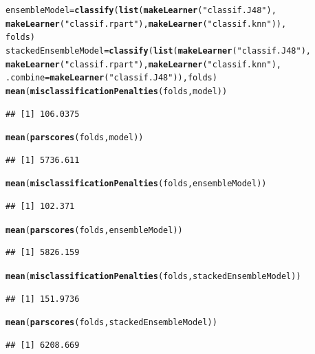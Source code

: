 \documentclass{article}\usepackage[]{graphicx}\usepackage[]{color}
\makeatletter
\newcommand{\hlstr}[1]{\textcolor[rgb]{0.192,0.494,0.8}{#1}}%
\newcommand{\hlstd}[1]{\textcolor[rgb]{0.345,0.345,0.345}{#1}}%
\newcommand{\hlkwb}[1]{\textcolor[rgb]{0.69,0.353,0.396}{#1}}%
\newcommand{\hlkwc}[1]{\textcolor[rgb]{0.333,0.667,0.333}{#1}}%
\newcommand{\hlkwd}[1]{\textcolor[rgb]{0.737,0.353,0.396}{\textbf{#1}}}%
\newenvironment{kframe}{%
 \def\at@end@of@kframe{}%
 \ifinner\ifhmode%
  \def\at@end@of@kframe{\end{minipage}}%
  \begin{minipage}{\columnwidth}%
 \fi\fi%
 \def\FrameCommand##1{\hskip\@totalleftmargin \hskip-\fboxsep
 \colorbox{shadecolor}{##1}\hskip-\fboxsep
     \hskip-\linewidth \hskip-\@totalleftmargin \hskip\columnwidth}%
 \MakeFramed {\advance\hsize-\width
   \@totalleftmargin\z@ \linewidth\hsize
   \@setminipage}}%
 {\par\unskip\endMakeFramed%
 \at@end@of@kframe}
\newenvironment{knitrout}{}{} %
\makeatother
\begin{document}
\begin{knitrout}
\color{fgcolor}\begin{kframe}
\begin{alltt}
\hlstd{ensembleModel} \hlkwb{=} \hlkwd{classify}\hlstd{(}\hlkwd{list}\hlstd{(}\hlkwd{makeLearner}\hlstd{(}\hlstr{"classif.J48"}\hlstd{),}
    \hlkwd{makeLearner}\hlstd{(}\hlstr{"classif.rpart"}\hlstd{),} \hlkwd{makeLearner}\hlstd{(}\hlstr{"classif.knn"}\hlstd{)),}
    \hlstd{folds)}
\hlstd{stackedEnsembleModel} \hlkwb{=} \hlkwd{classify}\hlstd{(}\hlkwd{list}\hlstd{(}\hlkwd{makeLearner}\hlstd{(}\hlstr{"classif.J48"}\hlstd{),}
    \hlkwd{makeLearner}\hlstd{(}\hlstr{"classif.rpart"}\hlstd{),} \hlkwd{makeLearner}\hlstd{(}\hlstr{"classif.knn"}\hlstd{),}
    \hlkwc{.combine} \hlstd{=} \hlkwd{makeLearner}\hlstd{(}\hlstr{"classif.J48"}\hlstd{)), folds)}
\hlkwd{mean}\hlstd{(}\hlkwd{misclassificationPenalties}\hlstd{(folds, model))}
\end{alltt}
\begin{verbatim}
## [1] 106.0375
\end{verbatim}
\begin{alltt}
\hlkwd{mean}\hlstd{(}\hlkwd{parscores}\hlstd{(folds, model))}
\end{alltt}
\begin{verbatim}
## [1] 5736.611
\end{verbatim}
\begin{alltt}
\hlkwd{mean}\hlstd{(}\hlkwd{misclassificationPenalties}\hlstd{(folds, ensembleModel))}
\end{alltt}
\begin{verbatim}
## [1] 102.371
\end{verbatim}
\begin{alltt}
\hlkwd{mean}\hlstd{(}\hlkwd{parscores}\hlstd{(folds, ensembleModel))}
\end{alltt}
\begin{verbatim}
## [1] 5826.159
\end{verbatim}
\begin{alltt}
\hlkwd{mean}\hlstd{(}\hlkwd{misclassificationPenalties}\hlstd{(folds, stackedEnsembleModel))}
\end{alltt}
\begin{verbatim}
## [1] 151.9736
\end{verbatim}
\begin{alltt}
\hlkwd{mean}\hlstd{(}\hlkwd{parscores}\hlstd{(folds, stackedEnsembleModel))}
\end{alltt}
\begin{verbatim}
## [1] 6208.669
\end{verbatim}
\end{kframe}
\end{knitrout}
\end{document}

